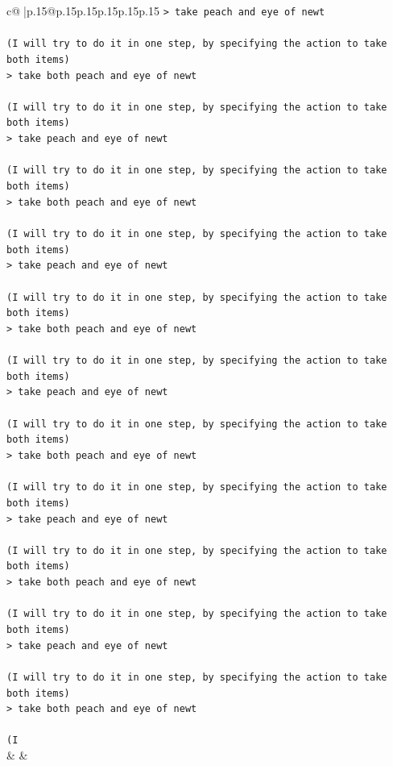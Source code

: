 \documentclass{article}
\begin{document}
{\begin{supertabular}{c@{$\;$}|p{.15\linewidth}@{}p{.15\linewidth}p{.15\linewidth}p{.15\linewidth}p{.15\linewidth}p{.15\linewidth}}
{{{\texttt{> take peach and eye of newt } \\
\\ 
\texttt{(I will try to do it in one step, by specifying the action to take both items) } \\
\texttt{> take both peach and eye of newt } \\
\\ 
\texttt{(I will try to do it in one step, by specifying the action to take both items) } \\
\texttt{> take peach and eye of newt } \\
\\ 
\texttt{(I will try to do it in one step, by specifying the action to take both items) } \\
\texttt{> take both peach and eye of newt } \\
\\ 
\texttt{(I will try to do it in one step, by specifying the action to take both items) } \\
\texttt{> take peach and eye of newt } \\
\\ 
\texttt{(I will try to do it in one step, by specifying the action to take both items) } \\
\texttt{> take both peach and eye of newt } \\
\\ 
\texttt{(I will try to do it in one step, by specifying the action to take both items) } \\
\texttt{> take peach and eye of newt } \\
\\ 
\texttt{(I will try to do it in one step, by specifying the action to take both items) } \\
\texttt{> take both peach and eye of newt } \\
\\ 
\texttt{(I will try to do it in one step, by specifying the action to take both items) } \\
\texttt{> take peach and eye of newt } \\
\\ 
\texttt{(I will try to do it in one step, by specifying the action to take both items) } \\
\texttt{> take both peach and eye of newt } \\
\\ 
\texttt{(I will try to do it in one step, by specifying the action to take both items) } \\
\texttt{> take peach and eye of newt } \\
\\ 
\texttt{(I will try to do it in one step, by specifying the action to take both items) } \\
\texttt{> take both peach and eye of newt } \\
\\ 
\texttt{(I} \\
            }
        }
    }
    & & \\ \\


\end{supertabular}}
\end{document}
